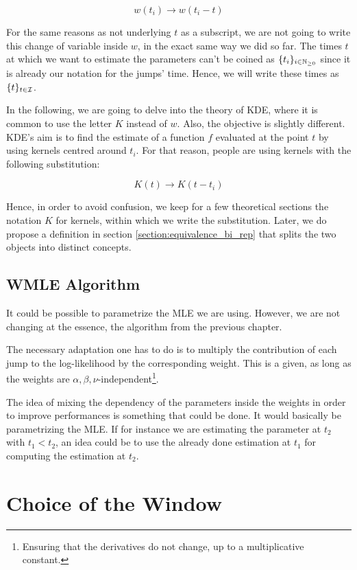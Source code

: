 $$w(t_i) \to w(  t_i - t ) $$

For the same reasons as not underlying $t$ as a subscript, we are not going to write this change of variable inside $w$, in the exact same way we did so far. The times $t$ at which we want to estimate the parameters can't be coined as $\{ t_i \}_{ i \in \mathbb{N}_{\geq 0}}$ since it is already our notation for the jumps' time. Hence, we will write these times as $\{t\}_{t \in \mathcal I}$.

In the following, we are going to delve into the theory of KDE, where it is common to use the letter $K$ instead of $w$. Also, the objective is slightly different. KDE's aim is to find the estimate of a function $f$ evaluated at the point $t$ by using kernels centred around $t_i$. For that reason, people are using kernels with the following substitution:

$$ K(t) \to K(t - t_i)$$

Hence, in order to avoid confusion, we keep for a few theoretical sections the notation $K$ for kernels, within which we write the substitution. Later, we do propose a definition in section \ref{section:equivalence_bi_rep} that splits the two objects into distinct concepts.


\subsection{WMLE Algorithm}
It could be possible to parametrize the MLE we are using. However, we are not changing at the essence, the algorithm from the previous chapter. 

The necessary adaptation one has to do is to multiply the contribution of each jump to the log-likelihood by the corresponding weight. This is a given, as long as the weights are $\alpha, \beta, \nu$-independent\footnote{Ensuring that the derivatives do not change, up to a multiplicative constant.}. 

The idea of mixing the dependency of the parameters inside the weights in order to improve performances is something that could be done. It would basically be parametrizing the MLE. If for instance we are estimating the parameter at $t_2$ with $t_1 < t_2$, an idea could be to use the already done estimation at $t_1$ for computing the estimation at $t_2$.





\section{Choice of the Window}

